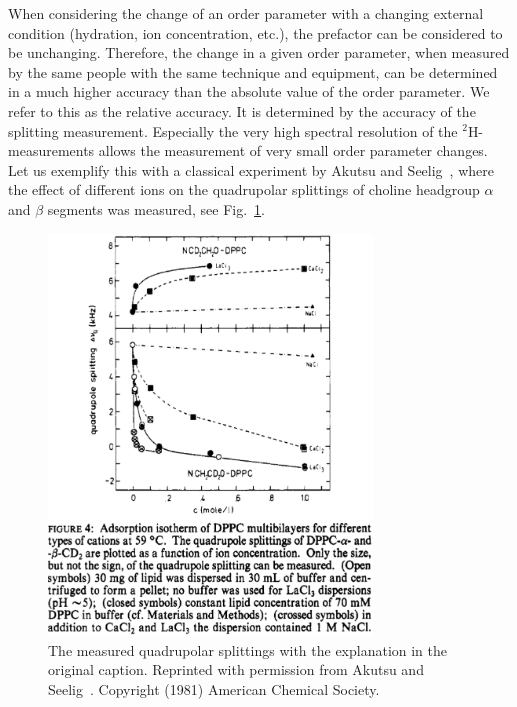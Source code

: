 \documentclass[aps,prl,superscriptaddress,twocolumn]{revtex4}
\begin{document}
When considering the change of an order parameter with a changing external condition (hydration, ion concentration, etc.), 
the prefactor can be considered to be unchanging. Therefore, the change in a given order parameter, when measured by the 
same people with the same technique and equipment, can be determined in a much higher accuracy than the absolute value of 
the order parameter. We refer to this as the relative accuracy. It is determined by the accuracy of the splitting measurement. 
Especially the very high spectral resolution of the $^2$H-measurements allows the measurement of very small order parameter changes. 
Let us exemplify this with a classical experiment by Akutsu and Seelig~\cite{akutsu81}, where the effect of different ions on 
the quadrupolar splittings of choline headgroup $\alpha$ and $\beta$ segments was measured, see Fig.~\ref{QUADsplitIONeffect}. 
\begin{figure}[]
  \includegraphics[width=8.6cm]{../Fig/QUADsplitIONeffect.eps}
\newline
  \caption{\label{QUADsplitIONeffect}
    The measured quadrupolar splittings with the explanation in the original caption. 
    Reprinted with permission from Akutsu and Seelig~\cite{akutsu81}. Copyright (1981) American Chemical Society.
} 
\end{figure}
\end{document}
